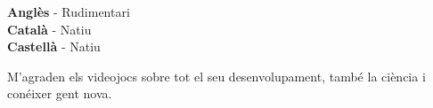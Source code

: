 \documentclass[9pt]{developercv} %
\begin{document}
\begin{minipage}[t]{0.3\textwidth}
	\vspace{-\baselineskip} %


	\textbf{Anglès} - Rudimentari\\
	\textbf{Català} - Natiu\\
	\textbf{Castellà} - Natiu
\end{minipage}
\hfill
\begin{minipage}[t]{0.3\textwidth}
	\vspace{-\baselineskip} %


	M'agraden els videojocs sobre tot el seu desenvolupament, també la ciència i conéixer gent nova.

\end{minipage}
\hfill

\end{document}
